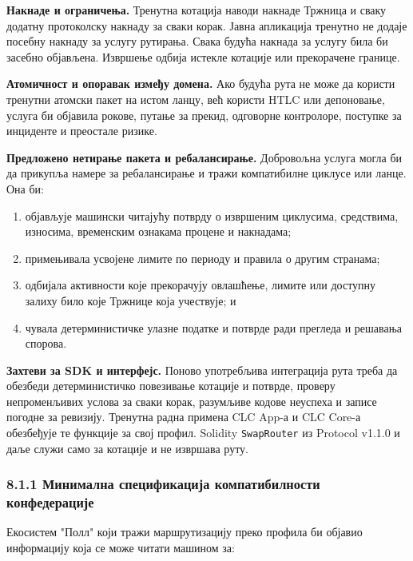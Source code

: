 \documentclass[11pt]{article}
\begin{document}
\textbf{Накнаде и ограничења.} Тренутна котација наводи накнаде Тржница и сваку додатну протоколску накнаду за сваки корак. Јавна апликација тренутно не додаје посебну накнаду за услугу рутирања. Свака будућа накнада за услугу била би засебно објављена. Извршење одбија истекле котације или прекорачене границе.

\textbf{Атомичност и опоравак између домена.} Ако будућа рута не може да користи тренутни атомски пакет на истом ланцу, већ користи HTLC или депоновање, услуга би објавила рокове, путање за прекид, одговорне контролоре, поступке за инциденте и преостале ризике.

\textbf{Предложено нетирање пакета и ребалансирање.} Добровољна услуга могла би да прикупља намере за ребалансирање и тражи компатибилне циклусе или ланце. Она би:

\begin{enumerate}[leftmargin=*]
\item објављује машински читајућу потврду о извршеним циклусима, средствима, износима, временским ознакама процене и накнадама;
\item примењивала усвојене лимите по периоду и правила о другим странама;
\item одбијала активности које прекорачују овлашћење, лимите или доступну залиху било које Тржнице која учествује; и
\item чувала детерминистичке улазне податке и потврде ради прегледа и решавања спорова.
\end{enumerate}
\textbf{Захтеви за SDK и интерфејс.} Поново употребљива интеграција рута треба да обезбеди детерминистичко повезивање котације и потврде, проверу непроменљивих услова за сваки корак, разумљиве кодове неуспеха и записе погодне за ревизију. Тренутна радна примена CLC App-а и CLC Core-а обезбеђује те функције за свој профил. Solidity \texttt{SwapRouter} из Protocol v1.1.0 и даље служи само за котације и не извршава руту.

\subsubsection*{8.1.1 Минимална спецификација компатибилности конфедерације}

Екосистем "Полл" који тражи маршрутизацију преко профила би објавио информацију која се може читати машином за:
\end{document}
